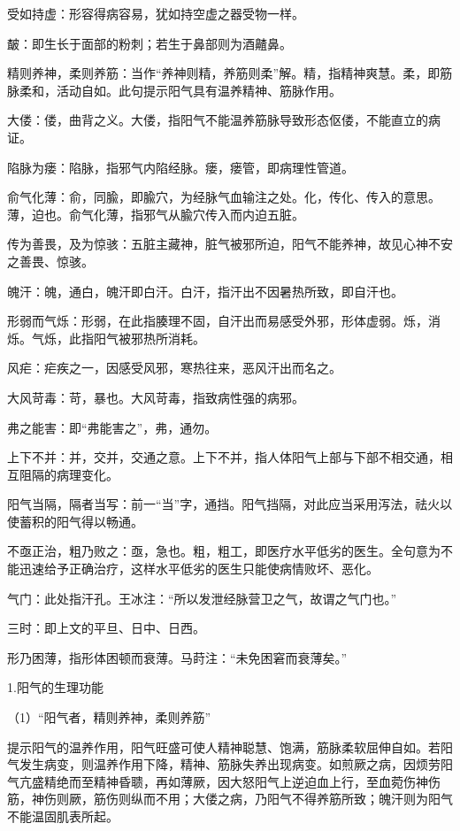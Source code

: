 \documentclass[draft,12pt]{ctexbook}
\begin{document}
\begin{jiaozhu}
  \item 受如持虚：形容得病容易，犹如持空虚之器受物一样。
  \item 皶：即生长于面部的粉刺；若生于鼻部则为酒齄鼻。
  \item 精则养神，柔则养筋：当作“养神则精，养筋则柔”解。精，指精神爽慧。柔，即筋脉柔和，活动自如。此句提示阳气具有温养精神、筋脉作用。
  \item 大偻：偻，曲背之义。大偻，指阳气不能温养筋脉导致形态伛偻，不能直立的病证。
  \item 陷脉为瘘：陷脉，指邪气内陷经脉。瘘，瘘管，即病理性管道。
  \item 俞气化薄：俞，同腧，即腧穴，为经脉气血输注之处。化，传化、传入的意思。薄，迫也。俞气化薄，指邪气从腧穴传入而内迫五脏。
  \item 传为善畏，及为惊骇：五脏主藏神，脏气被邪所迫，阳气不能养神，故见心神不安之善畏、惊骇。
  \item 魄汗：魄，通白，魄汗即白汗。白汗，指汗出不因暑热所致，即自汗也。
  \item 形弱而气烁：形弱，在此指腠理不固，自汗出而易感受外邪，形体虚弱。烁，消烁。气烁，此指阳气被邪热所消耗。
  \item 风疟：疟疾之一，因感受风邪，寒热往来，恶风汗出而名之。
  \item 大风苛毒：苛，暴也。大风苛毒，指致病性强的病邪。
  \item 弗之能害：即“弗能害之”，弗，通勿。
  \item 上下不并：并，交并，交通之意。上下不并，指人体阳气上部与下部不相交通，相互阻隔的病理变化。
  \item 阳气当隔，隔者当写：前一“当”字，通挡。阳气挡隔，对此应当采用泻法，祛火以使蓄积的阳气得以畅通。
  \item 不亟正治，粗乃败之：亟，急也。粗，粗工，即医疗水平低劣的医生。全句意为不能迅速给予正确治疗，这样水平低劣的医生只能使病情败坏、恶化。
  \item 气门：此处指汗孔。王冰注：“所以发泄经脉营卫之气，故谓之气门也。”
  \item 三时：即上文的平旦、日中、日西。
  \item 形乃困薄，指形体困顿而衰薄。马莳注：“未免困窘而衰薄矣。”
\end{jiaozhu}


1.阳气的生理功能

（1）“阳气者，精则养神，柔则养筋”

提示阳气的温养作用，阳气旺盛可使人精神聪慧、饱满，筋脉柔软屈伸自如。若阳气发生病变，则温养作用下降，精神、筋脉失养出现病变。如煎厥之病，因烦劳阳气亢盛精绝而至精神昏聩，再如薄厥，因大怒阳气上逆迫血上行，至血菀伤神伤筋，神伤则厥，筋伤则纵而不用；大偻之病，乃阳气不得养筋所致；魄汗则为阳气不能温固肌表所起。
\end{document}

